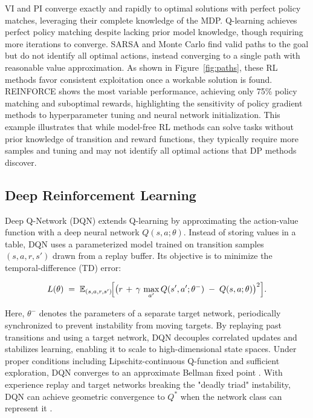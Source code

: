 VI and PI converge exactly and rapidly to optimal solutions with perfect policy matches, leveraging their complete knowledge of the MDP. Q-learning achieves perfect policy matching despite lacking prior model knowledge, though requiring more iterations to converge. SARSA and Monte Carlo find valid paths to the goal but do not identify all optimal actions, instead converging to a single path with reasonable value approximation. As shown in Figure~\ref{fig:paths}, these RL methods favor consistent exploitation once a workable solution is found. REINFORCE shows the most variable performance, achieving only 75\% policy matching and suboptimal rewards, highlighting the sensitivity of policy gradient methods to hyperparameter tuning and neural network initialization. This example illustrates that while model-free RL methods can solve tasks without prior knowledge of transition and reward functions, they typically require more samples and tuning and may not identify all optimal actions that DP methods discover. 

\subsection{Deep Reinforcement Learning}

Deep Q-Network (DQN) extends Q-learning by approximating the action-value function with a deep neural network \(Q(s,a;\theta)\). Instead of storing values in a table, DQN uses a parameterized model trained on transition samples \((s,a,r,s')\) drawn from a replay buffer. Its objective is to minimize the temporal-difference (TD) error:

\[
L(\theta) \;=\; \mathbb{E}_{(s,a,r,s')}\!\Bigl[\bigl(r \,+ \,\gamma \,\max_{a'} Q(s',a';\theta^-)\;-\;Q(s,a;\theta)\bigr)^2\Bigr].
\]

Here, \(\theta^-\) denotes the parameters of a separate target network, periodically synchronized to prevent instability from moving targets. By replaying past transitions and using a target network, DQN decouples correlated updates and stabilizes learning, enabling it to scale to high-dimensional state spaces. Under proper conditions including Lipschitz-continuous Q-function and sufficient exploration, DQN converges to an approximate Bellman fixed point \cite{Ramaswamy2021}. With experience replay and target networks breaking the "deadly triad" instability, DQN can achieve geometric convergence to $Q^*$ when the network class can represent it \cite{Zhang2023}.

